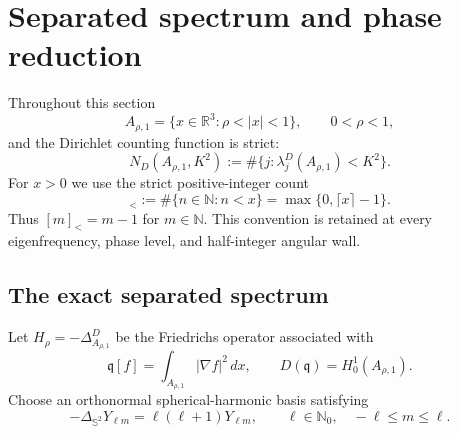 \documentclass[11pt]{article}
\numberwithin{equation}{section}
\theoremstyle{definition}
\theoremstyle{remark}
\begin{document}
\section{Separated spectrum and phase reduction}
\label{sec:sc-spectrum-small-hole}

Throughout this section
\[
  A_{\rho,1}=\{x\in\mathbb R^3:\rho<|x|<1\},
  \qquad 0<\rho<1,
\]
and the Dirichlet counting function is strict:
\[
  N_D(A_{\rho,1},K^2)
  :=\#\{j:\lambda_j^D(A_{\rho,1})<K^2\}.
\]
For \(x>0\) we use the strict positive-integer count
\begin{equation}
  [x]_<:=\#\{n\in\mathbb N:n<x\}
  =\max\{0,\lceil x\rceil-1\}.
  \label{eq:sc-strict-bracket}
\end{equation}
Thus \([m]_< =m-1\) for \(m\in\mathbb N\).  This convention is retained
at every eigenfrequency, phase level, and half-integer angular wall.

\subsection{The exact separated spectrum}

Let \(H_\rho=-\Delta^D_{A_{\rho,1}}\) be the Friedrichs operator associated
with
\[
  \mathfrak q[f]=\int_{A_{\rho,1}}|\nabla f|^2\,dx,
  \qquad D(\mathfrak q)=H_0^1(A_{\rho,1}).
\]
Choose an orthonormal spherical-harmonic basis satisfying
\[
  -\Delta_{\mathbb S^2}Y_{\ell m}
  =\ell(\ell+1)Y_{\ell m},
  \qquad \ell\in\mathbb N_0,
  \quad -\ell\le m\le\ell.
\]
\end{document}
